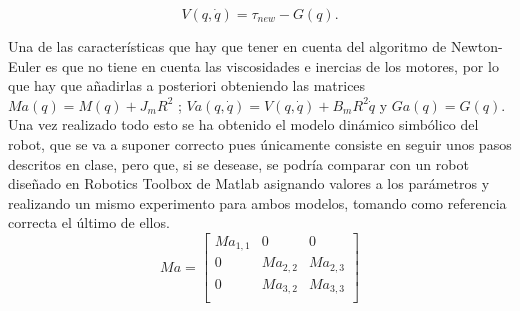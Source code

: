 \begin{equation}
V(q,\dot{q})=\tau_{new}-G(q).
\end{equation}

Una de las características que hay que tener en cuenta del algoritmo de Newton-Euler es que no tiene en cuenta las viscosidades e inercias de los motores, por lo que hay que añadirlas a posteriori obteniendo las matrices $Ma(q)=M(q)+J_mR^2$ ; $Va(q,\dot{q})=V(q,\dot{q})+B_mR^2\dot{q}$ y $Ga(q)=G(q)$.\\

Una vez realizado todo esto se ha obtenido el modelo dinámico simbólico del robot, que se va a suponer correcto pues únicamente consiste en seguir unos pasos descritos en clase, pero que, si se desease, se podría comparar con un robot diseñado en Robotics Toolbox de Matlab asignando valores a los parámetros y realizando un mismo experimento para ambos modelos, tomando como referencia correcta el último de ellos.\\
\newpage
\[
Ma=
\begin{bmatrix}
Ma_{1,1} & 0 & 0\\
0 & Ma_{2,2} & Ma_{2,3}\\
0 & Ma_{3,2} & Ma_{3,3}\\
\end{bmatrix} \] 

